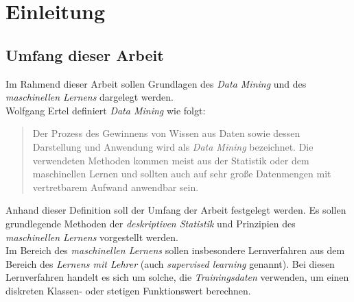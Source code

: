 \documentclass[fontsize=11pt]{scrartcl}
\author{Janek Boll}
\author{Steven Minich}
\date{\today}
\newcommand{\blankpage}{
\newpage
\thispagestyle{empty}
\mbox{}
\newpage
}
\newcommand*{\zitat}{%
    \footnotesize 
}
\begin{document}
    

    \blankpage

    
    \newpage
    

    \blankpage
    
    \vspace*{\fill}
    
    \begin{abstract}
        \lipsum[1]
    \end{abstract}
    \vspace*{\fill}
    
    \newpage
    
    \tableofcontents
    
    \newpage

        \section{Einleitung}
            \subsection{Umfang dieser Arbeit}
                Im Rahmend dieser Arbeit sollen Grundlagen des \emph{Data Mining} und des \emph{maschinellen Lernens} dargelegt werden.\\
                Wolfgang Ertel definiert \emph{Data Mining} wie folgt:\\
                \begin{quote}
                    \glqq Der Prozess des Gewinnens von Wissen aus Daten sowie dessen Darstellung und Anwendung wird als \emph{Data Mining} bezeichnet. Die verwendeten Methoden kommen meist aus der Statistik oder dem maschinellen Lernen und sollten auch auf sehr große Datenmengen mit vertretbarem Aufwand anwendbar sein.\grqq\\
                    \raggedleft\footnotesize\cite[S.196]{ertel2016} 
                \end{quote}

                Anhand dieser Definition soll der Umfang der Arbeit festgelegt werden. Es sollen grundlegende Methoden der \emph{deskriptiven Statistik} und Prinzipien des \emph{maschinellen Lernens} vorgestellt werden.\\
                Im Bereich des \emph{maschinellen Lernens} sollen insbesondere Lernverfahren aus dem Bereich des \emph{Lernens mit Lehrer} (auch \emph{supervised learning} genannt). Bei diesen Lernverfahren handelt es sich um solche, die \emph{Trainingsdaten} verwenden, um einen diskreten Klassen- oder stetigen Funktionswert berechnen. \cite{ertel2016}
\end{document}
